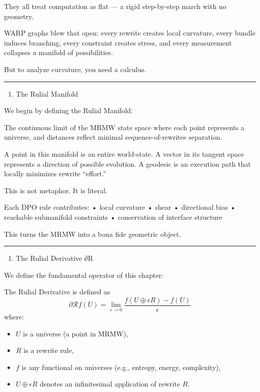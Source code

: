 They all treat computation as flat --- a rigid step-by-step march with
no geometry.

WARP graphs blew that open: every rewrite creates local curvature, every bundle
induces branching, every constraint creates stress, and every
measurement collapses a manifold of possibilities.

But to analyze curvature, you need a calculus.

\begin{center}\rule{0.5\linewidth}{0.5pt}\end{center}

\begin{enumerate}
\def\labelenumi{\arabic{enumi}.}
\setcounter{enumi}{1}
\tightlist
\item
  The Rulial Manifold
\end{enumerate}

We begin by defining the Rulial Manifold:

The continuous limit of the MRMW state space where each point represents
a universe, and distances reflect minimal sequence-of-rewrites
separation.

A point in this manifold is an entire world-state. A vector in its
tangent space represents a direction of possible evolution. A geodesic
is an execution path that locally minimizes rewrite ``effort.''

This is not metaphor. It is literal.

Each DPO rule contributes: • local curvature • shear • directional bias
• reachable submanifold constraints • conservation of interface
structure

This turns the MRMW into a bona fide geometric object.

\begin{center}\rule{0.5\linewidth}{0.5pt}\end{center}

\begin{enumerate}
\def\labelenumi{\arabic{enumi}.}
\setcounter{enumi}{2}
\tightlist
\item
  The Rulial Derivative ∂R
\end{enumerate}

We define the fundamental operator of this chapter:

The Rulial Derivative is defined as
\[
  \partial \mathcal{R} f(U) = \lim_{\epsilon \to 0}
  \frac{f(U \oplus \epsilon R) - f(U)}{\epsilon}
\]
where:
\begin{itemize}
  \item $U$ is a universe (a point in MRMW),
  \item $R$ is a rewrite rule,
  \item $f$ is any functional on universes (e.g., entropy, energy, complexity),
  \item $U \oplus \epsilon R$ denotes an infinitesimal application of rewrite $R$.
\end{itemize}

